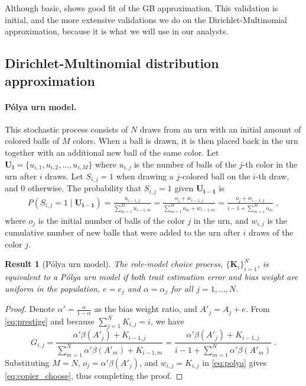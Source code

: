 \documentclass[12pt]{extarticle}
\let\vec\mathbf
\newtheorem{result}{Result}
\begin{document}
Although basic,  shows good fit of the GB approximation.
This validation is initial, and the more extensive validations we do on the Dirichlet-Multinomial approximation, because it is what we will use in our analysts.

\subsection*{Dirichlet-Multinomial distribution approximation}

\paragraph{P\'{o}lya urn model.}
This stochastic process consists of $N$ draws from an urn with an initial amount of colored balls of $M$ colors. When a ball is drawn, it is then placed back in the urn together with an additional new ball of the same color.
Let $\vec{U_i} = \{u_{i,1},u_{i,2},...,u_{i,M}\}$  where $u_{i,j}$ is the number of balls of the $j$-th color in the urn after $i$ draws.
Let $S_{i,j}=1$ when drawing a $j$-colored ball on the $i$-th draw, and $0$ otherwise. The probability that $S_{i,j}=1$ given $\vec{U_{i-1}}$ is
\begin{equation}\label{eq:polya}
\begin{split}
P(S_{i,j} = 1 \mid \vec{U_{i-1}}) = 
\frac{u_{i-1,j}}{\sum\limits_{m=1}^{M} u_{i-1,m}} = 
\frac{o_j + w_{i-1,j}}{\sum\limits_{m=1}^{M} o_m + w_{i-1,m}} = 
\frac{o_j + w_{i-1,j}}{i-1 + \sum\limits_{m=1}^{M} o_m} \;,
\end{split}
\end{equation}
where $o_j$ is the initial number of balls of the color $j$ in the urn, and $w_{i,j}$ is the cumulative number of new balls that were added to the urn after $i$ draws of the color $j$.
\\

\begin{result}[P{\'{o}}lya urn model]\label{result:polya}
The role-model choice process, $\big\{\vec{K}_i\big\}_{i=1}^N$, is equivalent to a \emph{P\'{o}lya urn model} if both trait estimation error and bias weight are uniform in the population, $e=e_j$ and $\alpha=\alpha_j$ for all $j=1,\ldots,N$.
\end{result}

\begin{proof} 
Denote $\alpha'=\frac{\alpha}{1-\alpha}$ as the bias weight ratio, and $A'_j=A_j+e$. From \cref{eq:prestige} and because $\sum_{j=1}^{N}{K_{i,j}}=i$, we have
\begin{equation}\label{eq:copier_choose}
G_{i,j} = 
\frac{\alpha'\beta(A'_j) + K_{i-1,j}}{\sum\limits_{m=1}^{N} \alpha'\beta(A'_m) + K_{i-1,m}}
 =\frac{\alpha'\beta(A'_j) + K_{i-1,j}}{i-1 + \sum\limits_{m=1}^{N}\alpha'\beta(A'_m)} \;.
\end{equation}
Substituting $M=N$, $o_j = \alpha'\beta(A'_j)$, and $w_{i,j} = K_{i,j}$ in \cref{eq:polya} gives \cref{eq:copier_choose}, thus completing the proof.
\end{proof} 
\end{document}
